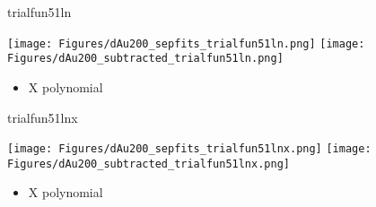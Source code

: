 \documentclass[aspectratio=169,compress,10pt]{beamer}
\begin{document}


\begin{frame}{trialfun51ln}
\begin{center}
\texttt{[image: Figures/dAu200\_sepfits\_trialfun51ln.png]}
\texttt{[image: Figures/dAu200\_subtracted\_trialfun51ln.png]}
\end{center}
\begin{itemize}
\item X polynomial
\end{itemize}
\end{frame}




\begin{frame}{trialfun51lnx}
\begin{center}
\texttt{[image: Figures/dAu200\_sepfits\_trialfun51lnx.png]}
\texttt{[image: Figures/dAu200\_subtracted\_trialfun51lnx.png]}
\end{center}
\begin{itemize}
\item X polynomial
\end{itemize}
\end{frame}


\end{document}
